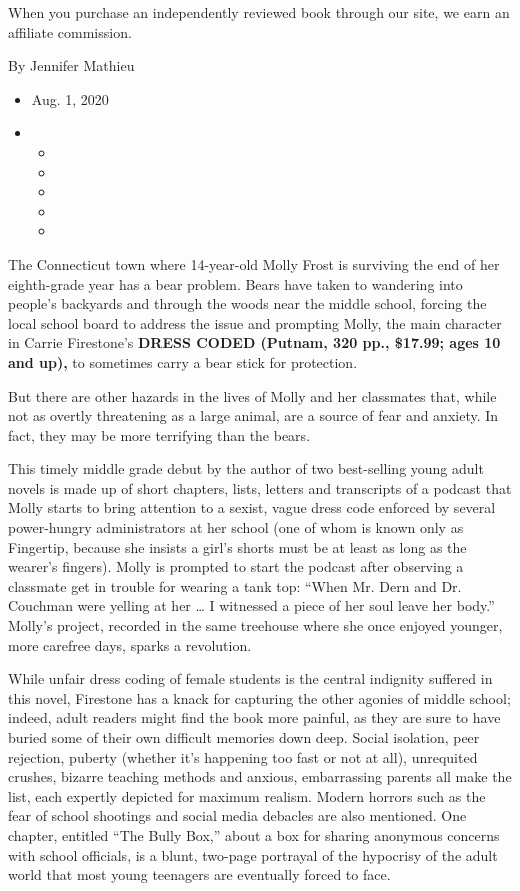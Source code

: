 When you purchase an independently reviewed book through our site, we
earn an affiliate commission.

By Jennifer Mathieu

\begin{itemize}
\item
  Aug. 1, 2020
\item
  \begin{itemize}
  \item
  \item
  \item
  \item
  \item
  \end{itemize}
\end{itemize}

The Connecticut town where 14-year-old Molly Frost is surviving the end
of her eighth-grade year has a bear problem. Bears have taken to
wandering into people's backyards and through the woods near the middle
school, forcing the local school board to address the issue and
prompting Molly, the main character in Carrie Firestone's \textbf{DRESS
CODED (Putnam, 320 pp., \$17.99; ages 10 and up),} to sometimes carry a
bear stick for protection.

But there are other hazards in the lives of Molly and her classmates
that, while not as overtly threatening as a large animal, are a source
of fear and anxiety. In fact, they may be more terrifying than the
bears.

This timely middle grade debut by the author of two best-selling young
adult novels is made up of short chapters, lists, letters and
transcripts of a podcast that Molly starts to bring attention to a
sexist, vague dress code enforced by several power-hungry administrators
at her school (one of whom is known only as Fingertip, because she
insists a girl's shorts must be at least as long as the wearer's
fingers). Molly is prompted to start the podcast after observing a
classmate get in trouble for wearing a tank top: ``When Mr. Dern and Dr.
Couchman were yelling at her \ldots{} I witnessed a piece of her soul
leave her body.'' Molly's project, recorded in the same treehouse where
she once enjoyed younger, more carefree days, sparks a revolution.

While unfair dress coding of female students is the central indignity
suffered in this novel, Firestone has a knack for capturing the other
agonies of middle school; indeed, adult readers might find the book more
painful, as they are sure to have buried some of their own difficult
memories down deep. Social isolation, peer rejection, puberty (whether
it's happening too fast or not at all), unrequited crushes, bizarre
teaching methods and anxious, embarrassing parents all make the list,
each expertly depicted for maximum realism. Modern horrors such as the
fear of school shootings and social media debacles are also mentioned.
One chapter, entitled ``The Bully Box,'' about a box for sharing
anonymous concerns with school officials, is a blunt, two-page portrayal
of the hypocrisy of the adult world that most young teenagers are
eventually forced to face.

